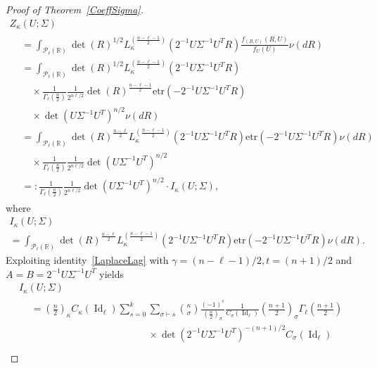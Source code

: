 \documentclass[10pt]{amsart}
\theoremstyle{definition}\newtheorem{defi}[theo]{Definition}\newtheorem{rema}[theo]{Remark}\newtheorem{exam}[theo]{Example}\newtheorem{exem}[theo]{Example}\newtheorem{nota}[theo]{Notation}
\DeclareMathOperator{\Id}{Id}
\newcommand{\clP}{\mathcal{P}}
\newcommand{\R}{\mathbb{R}}
\newcommand{\etr}[1]{\mathrm{etr}\left(#1\right)}
\begin{document}
\begin{proof}[Proof of Theorem~\ref{CoeffSigma}]
\break
\begin{multline}\label{ZUexp}
Z_{\kappa}(U;\Sigma)\\
\begin{aligned}
&= \int_{\clP_{\ell}(\R)} \det(R)^{1/2} L_{\kappa}^{\left(\frac{n-\ell-1}{2}\right)}\left(2^{-1}U\Sigma^{-1}U^TR\right)
\frac{f_{(R,U)}(R,U)}{f_U(U)} \nu(dR)\\
&= \int_{\clP_{\ell}(\R)} \det(R)^{1/2} L_{\kappa}^{\left(\frac{n-\ell-1}{2}\right)}\left(2^{-1}U\Sigma^{-1}U^TR\right)
\\
& \quad\times \frac{1}{\Gamma_{\ell}(\frac{n}{2})}
\frac{1}{2^{n\ell/2}} \det(R)^{\frac{n-\ell-1}{2}}
\etr{ -2^{-1}U\Sigma^{-1}U^TR} \\
& \quad\times \det\left(U\Sigma^{-1}U^T\right)^{ n/2} \nu(dR) \\
&=\int_{\clP_{\ell}(\R)} \det(R)^{\frac{n-\ell}{2}} L_{\kappa}^{\left(\frac{n-\ell-1}{2}\right)}\left(2^{-1}U\Sigma^{-1}U^TR\right)
\etr{ -2^{-1}U\Sigma^{-1}U^TR} \nu(dR)\\
&\quad\times \frac{1}{\Gamma_{\ell}\left(\frac{n}{2}\right)}
\frac{1}{2^{n\ell/2}} \det\left(U\Sigma^{-1}U^T\right)^{ n/2}\\
&=:\frac{1}{\Gamma_{\ell}\left(\frac{n}{2}\right)}
\frac{1}{2^{n\ell/2}} \det\left(U\Sigma^{-1}U^T\right)^{ n/2} \cdot I_{\kappa}(U;\Sigma),
\end{aligned}
\end{multline}
where
\begin{multline}\label{I}
I_{\kappa}(U;\Sigma)\\
=\int_{\clP_{\ell}(\R)} \det(R)^{\frac{n-\ell}{2}} L_{\kappa}^{\left(\frac{n-\ell-1}{2}\right)}\left(2^{-1}U\Sigma^{-1}U^TR\right)
\etr{ -2^{-1}U\Sigma^{-1}U^TR} \nu(dR).
\end{multline}
Exploiting identity~\eqref{LaplaceLag} with $\gamma=(n-\ell-1)/2, t=(n+1)/2$ and $A=B=2^{-1}U\Sigma^{-1}U^T$ yields
\begin{multline*}
I_{\kappa}(U;\Sigma)\\
\begin{aligned}
&=\left(\frac{n}{2}\right)_{\kappa} C_{\kappa}(\Id_{\ell})
\sum_{s=0}^{k} \sum_{\sigma \vdash s} \binom{\kappa}{\sigma} \frac{(-1)^s}{\left(\frac{n}{2}\right)_{\sigma}}\frac{1}{C_{\sigma}(\Id_{\ell})}
\left(\frac{n+1}{2}\right)_{\sigma} \Gamma_{\ell}\left(\frac{n+1}{2}\right) \\
&\hspace{5cm}\times \det\left(2^{-1}U\Sigma^{-1}U^T\right)^{-(n+1)/2}C_{\sigma}(\Id_{\ell}) \\

\end{aligned}
\end{multline*}
\end{proof}
\end{document}
